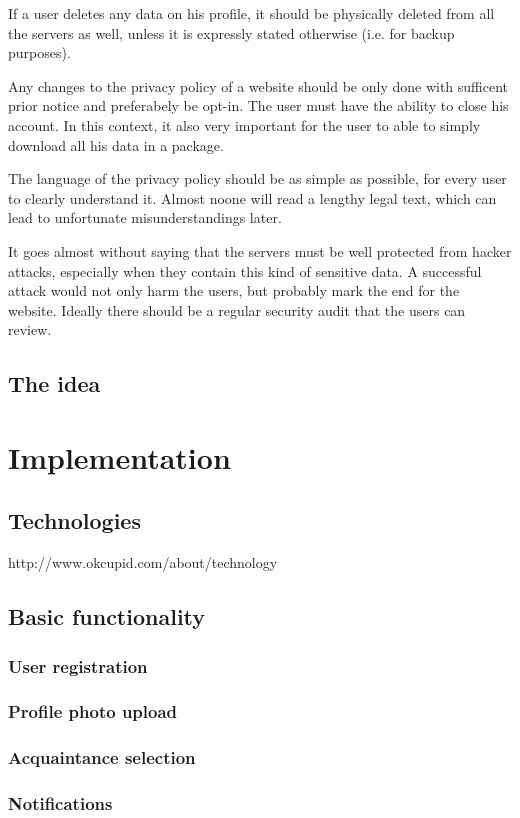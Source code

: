 \documentclass[11pt,draft,oneside]{fithesis}
\begin{document}
	If a user deletes any data on his profile, it should be physically deleted from all the servers as well, unless it is expressly stated otherwise (i.e. for backup purposes).
	
	Any changes to the privacy policy of a website should be only done with sufficent prior notice and preferabely be opt-in. The user must have the ability to close his account. In this context, it also very important for the user to able to simply download all his data in a package.
	
	The language of the privacy policy should be as simple as possible, for every user to clearly understand it. Almost noone will read a lengthy legal text, which can lead to unfortunate misunderstandings later.
	
	It goes almost without saying that the servers must be well protected from hacker attacks, especially when they contain this kind of sensitive data. A successful attack would not only harm the users, but probably mark the end for the website. Ideally there should be a regular security audit that the users can review.

\section{The idea}
	

\chapter{Implementation}
\section{Technologies}
http://www.okcupid.com/about/technology
\section{Basic functionality}
	\subsection{User registration}
	\subsection{Profile photo upload}
	\subsection{Acquaintance selection}
	\subsection{Notifications}
\end{document}
